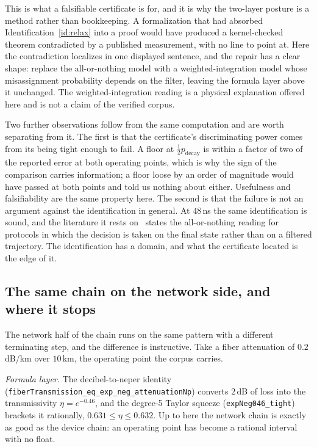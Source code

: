 \documentclass[aps,pra,reprint,nofootinbib,superscriptaddress]{revtex4-2}
\theoremstyle{plain}
\theoremstyle{definition}
\theoremstyle{remark}
\newcommand{\lean}[1]{\texttt{#1}}
\begin{document}
This is what a falsifiable certificate is for, and it is why the
two-layer posture is a method rather than bookkeeping. A formalization
that had absorbed Identification~\ref{id:relax} into a proof would have
produced a kernel-checked theorem contradicted by a published
measurement, with no line to point at. Here the contradiction localizes
in one displayed sentence, and the repair has a clear shape: replace the
all-or-nothing model with a weighted-integration model whose
misassignment probability depends on the filter, leaving the formula
layer above it unchanged. The weighted-integration reading is a physical
explanation offered here and is not a claim of the verified corpus.

Two further observations follow from the same computation and are worth
separating from it. The first is that the certificate's discriminating
power comes from its being tight enough to fail. A floor at
$\tfrac12 p_{\mathrm{decay}}$ is within a factor of two of the reported
error at both operating points, which is why the sign of the comparison
carries information; a floor loose by an order of magnitude would have
passed at both points and told us nothing about either. Usefulness and
falsifiability are the same property here. The second is that the failure
is not an argument against the identification in general. At
$48$\,ns the same identification is sound, and the literature it rests
on~\cite{Gambetta2007,Geerlings2013} states the all-or-nothing reading
for protocols in which the decision is taken on the final state rather
than on a filtered trajectory. The identification has a domain, and what
the certificate located is the edge of it.

\subsection{The same chain on the network side, and where it stops}
\label{sec:worked-network}

The network half of the chain runs on the same pattern with a different
terminating step, and the difference is instructive. Take a fiber
attenuation of $0.2$\,dB/km over $10$\,km, the operating point the corpus
carries.

\emph{Formula layer.} The decibel-to-neper identity
(\lean{fiberTransmission\_eq\_exp\_neg\_attenuationNp}) converts $2$\,dB
of loss into the transmissivity $\eta = e^{-0.46}$, and the degree-5
Taylor squeeze (\lean{expNeg046\_tight}) brackets it rationally,
$0.631 \le \eta \le 0.632$. Up to here the network chain is exactly as
good as the device chain: an operating point has become a rational
interval with no float.
\end{document}
